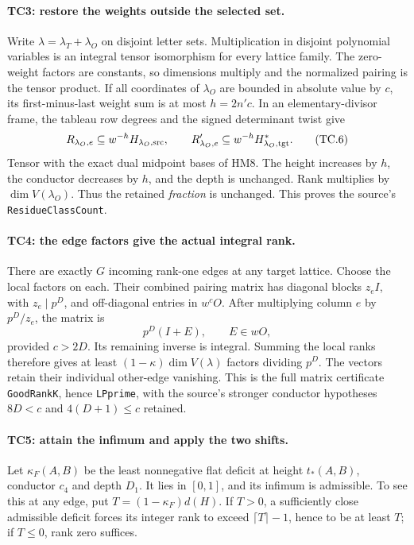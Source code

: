 \documentclass[11pt,a4paper]{article}
\numberwithin{equation}{section}
\theoremstyle{remark}\newtheorem{remark}[theorem]{Remark}
\begin{document}
\paragraph{TC3: restore the weights outside the selected set.}
Write $\lambda=\lambda_T+\lambda_O$ on disjoint letter sets.
Multiplication in disjoint polynomial variables is an integral
tensor isomorphism for every lattice family. The zero-weight
factors are constants, so dimensions multiply and the normalized
pairing is the tensor product. If all coordinates of $\lambda_O$
are bounded in absolute value by $c$, its first-minus-last weight
sum is at most $h=2n'c$. In an elementary-divisor frame, the
tableau row degrees and the signed determinant twist give
\[
 R_{\lambda_O,e}\subseteq w^{-h}H_{\lambda_O,\rm src},
 \qquad R'_{\lambda_O,e}
       \subseteq w^{-h}H_{\lambda_O,\rm tgt}^{*}.        \tag{TC.6}
\]
Tensor with the exact dual midpoint bases of HM8. The height
increases by $h$, the conductor decreases by $h$, and the depth
is unchanged. Rank multiplies by $\dim V(\lambda_O)$.
Thus the retained \emph{fraction} is unchanged. This proves
the source's \texttt{ResidueClassCount}.

\paragraph{TC4: the edge factors give the actual integral rank.}
There are exactly $G$ incoming rank-one edges at any target
lattice. Choose the local factors on each. Their combined pairing
matrix has diagonal blocks $z_eI$, with $z_e\mid p^D$, and
off-diagonal entries in $w^cO$. After multiplying column $e$
by $p^D/z_e$, the matrix is
\[
                         p^D(I+E),\qquad E\in wO,      \tag{TC.7}
\]
provided $c>2D$. Its remaining inverse is integral. Summing
the local ranks therefore gives at least
$(1-\kappa)\dim V(\lambda)$ factors dividing $p^D$.
The vectors retain their individual other-edge vanishing.
This is the full matrix certificate \texttt{GoodRankK}, hence
\texttt{LPprime}, with the source's stronger conductor hypotheses
$8D<c$ and $4(D+1)\le c$ retained.

\paragraph{TC5: attain the infimum and apply the two shifts.}
Let $\kappa_F(A,B)$ be the least nonnegative flat deficit at
height $t_*(A,B)$, conductor $c_4$ and depth $D_1$.
It lies in $[0,1]$, and its infimum is admissible.
To see this at any edge, put $T=(1-\kappa_F)d(H)$.
If $T>0$, a sufficiently close admissible deficit forces its
integer rank to exceed $\lceil T\rceil-1$, hence to be at least
$T$; if $T\le0$, rank zero suffices.
\end{document}
